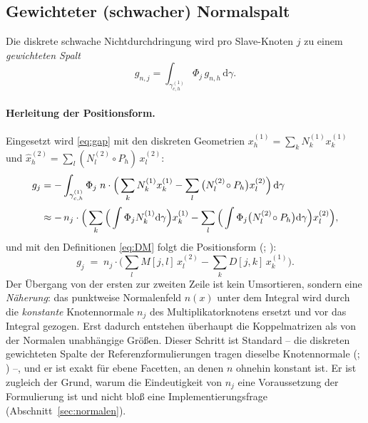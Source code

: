 \documentclass[a4paper,11pt]{article}
\def\bm#1{#1}%
\def\tilde#1{#1}%
\begin{document}
\subsection{Gewichteter (schwacher) Normalspalt}
Die diskrete schwache Nichtdurchdringung wird pro Slave-Knoten $j$ zu einem \emph{gewichteten Spalt}
\citep[Gl.~(3.40)]{farah}
\begin{equation}
\tilde g_{n,j} = \int_{\gamma_{c,h}^{(1)}} \Phi_j\, g_{n,h}\,\mathrm d\gamma .
\label{eq:wgap_int}
\end{equation}
\paragraph{Herleitung der Positionsform.} Eingesetzt wird \eqref{eq:gap} mit den diskreten
Geometrien $\bm x_h^{(1)}=\sum_k N_k^{(1)}\bm x_k^{(1)}$ und
$\hat{\bm x}_h^{(2)}=\sum_l (N_l^{(2)}\!\circ P_h)\,\bm x_l^{(2)}$:
\begin{align}
\tilde g_{j}
&= -\int_{\gamma_{c,h}^{(1)}} \Phi_j\;\bm n\cdot\Big(\sum_k N_k^{(1)}\bm x_k^{(1)}
   - \sum_l \big(N_l^{(2)}\!\circ P_h\big)\bm x_l^{(2)}\Big)\,\mathrm d\gamma \notag\\[2pt]
&\approx -\,\bm n_j\cdot\Big(\sum_k \Big(\int \Phi_j N_k^{(1)}\mathrm d\gamma\Big)\bm x_k^{(1)}
   - \sum_l \Big(\int \Phi_j \big(N_l^{(2)}\!\circ P_h\big)\mathrm d\gamma\Big)\bm x_l^{(2)}\Big) ,
\label{eq:wgap_herleitung}
\end{align}
und mit den Definitionen \eqref{eq:DM} folgt die Positionsform
(\citealp[Gl.~(36) und~(50)]{gitterle}; \citealp[Gl.~(50)]{poppgeewall2009}):
\begin{equation}
\tilde g_{j} \;=\; \bm n_j\!\cdot\!\Big(\sum_l \bm M[j,l]\,\bm x_l^{(2)}
- \sum_k \bm D[j,k]\,\bm x_k^{(1)}\Big).
\label{eq:wgap_pos}
\end{equation}
Der Übergang von der ersten zur zweiten Zeile ist kein Umsortieren, sondern eine \emph{Näherung}:
das punktweise Normalenfeld $\bm n(\bm x)$ unter dem Integral wird durch die \emph{konstante}
Knotennormale $\bm n_j$ des Multiplikatorknotens ersetzt und vor das Integral gezogen. Erst dadurch
entstehen überhaupt die Koppelmatrizen als von der Normalen unabhängige Größen. Dieser Schritt ist
Standard -- die diskreten gewichteten Spalte der Referenzformulierungen tragen dieselbe
Knotennormale (\citealp[Gl.~(50)]{poppgeewall2009}; \citealp[Gl.~(3.40)]{farah}) --, und er ist
exakt für ebene Facetten, an denen $\bm n$ ohnehin konstant ist. Er ist zugleich der Grund, warum
die Eindeutigkeit von $\bm n_j$ eine Voraussetzung der Formulierung ist und nicht bloß eine
Implementierungsfrage (Abschnitt~\ref{sec:normalen}).
\end{document}
